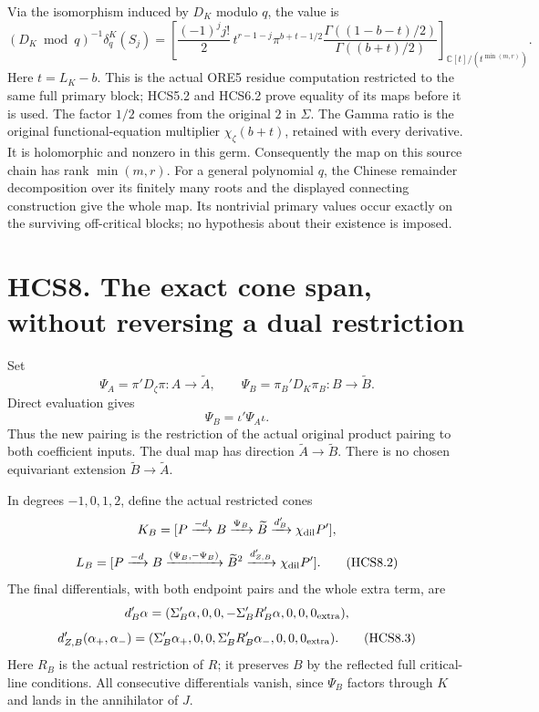 Via the isomorphism induced by \(D_K\) modulo \(q\), the value is \[
\boxed{
(D_K\bmod q)^{-1}\delta_q^K(S_j)=
\left[
\frac{(-1)^j j!}{2}\,t^{r-1-j}
\pi^{b+t-1/2}
\frac{\Gamma((1-b-t)/2)}{\Gamma((b+t)/2)}
\right]_{\mathbb C[t]/(t^{\min(m,r)})}.}
\tag{HCS7.10}
\] Here \(t=L_K-b\). This is the actual ORE5 residue computation
restricted to the same full primary block; HCS5.2 and HCS6.2 prove
equality of its maps before it is used. The factor \(1/2\) comes from
the original \(2\) in \(\Sigma\). The Gamma ratio is the original
functional-equation multiplier \(\chi_\zeta(b+t)\), retained with every
derivative. It is holomorphic and nonzero in this germ. Consequently the
map on this source chain has rank \(\min(m,r)\). For a general
polynomial \(q\), the Chinese remainder decomposition over its finitely
many roots and the displayed connecting construction give the whole map.
Its nontrivial primary values occur exactly on the surviving
off-critical blocks; no hypothesis about their existence is imposed.

\section{HCS8. The exact cone span, without reversing a dual
restriction}\label{hcs8.-the-exact-cone-span-without-reversing-a-dual-restriction}

Set \[
\Psi_A=\pi'D_\zeta\pi:A\to\widetilde A,\qquad
\Psi_B=\pi_B'D_K\pi_B:B\to\widetilde B.
\] Direct evaluation gives \[
\boxed{\Psi_B=\iota'\Psi_A\iota.}
\tag{HCS8.1}
\] Thus the new pairing is the restriction of the actual original
product pairing to both coefficient inputs. The dual map has direction
\(\widetilde A\to\widetilde B\). There is no chosen equivariant
extension \(\widetilde B\to\widetilde A\).

In degrees \(-1,0,1,2\), define the actual restricted cones \[
K_B=[P\xrightarrow{-d}B\xrightarrow{\Psi_B}
\widetilde B\xrightarrow{d_B'}\chi_{\rm dil}P'],
\] \[
L_B=[P\xrightarrow{-d}B\xrightarrow{(\Psi_B,-\Psi_B)}
\widetilde B^2\xrightarrow{d_{Z,B}'}\chi_{\rm dil}P'].
\tag{HCS8.2}
\] The final differentials, with both endpoint pairs and the whole extra
term, are \[
d_B'\alpha=(\Sigma_B'\alpha,0,0,
-\Sigma_B'R_B'\alpha,0,0,0_{\rm extra}),
\] \[
d_{Z,B}'(\alpha_+,\alpha_-)
=(\Sigma_B'\alpha_+,0,0,
\Sigma_B'R_B'\alpha_-,0,0,0_{\rm extra}).
\tag{HCS8.3}
\] Here \(R_B\) is the actual restriction of \(R\); it preserves \(B\)
by the reflected full critical-line conditions. All consecutive
differentials vanish, since \(\Psi_B\) factors through \(K\) and lands
in the annihilator of \(J\).


